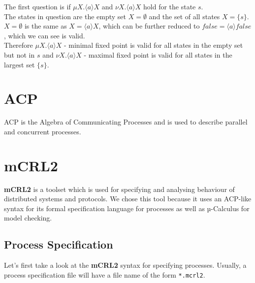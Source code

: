 \documentclass{clseminar}
\begin{document}
  \begin{center}
  \end{center}

  The first question is if $\mu X. \langle a \rangle X$ and $\nu X. \langle a \rangle X$ hold for the state $s$. \\
  The states in question are the empty set $X = \emptyset$ and the set of all states $X = \{s\}$. \\
  $X = \emptyset$ is the same as $X = \langle a \rangle X$, which can be further reduced to $\mathit{false} = \langle a \rangle \mathit{false}$, which we can see is valid. \\
  Therefore $\mu X. \langle a \rangle X$ - minimal fixed point is valid for all states in the empty set but not in $s$ and $\nu X. \langle a \rangle X$ - maximal fixed point is valid for all states in the largest set $\{s\}$.

  \section{ACP}

  ACP is the Algebra of Communicating Processes and is used to describe parallel and concurrent processes.

  \cite{groote2014}

  \section{mCRL2}

  \textbf{mCRL2} is a toolset which is used for specifying and analysing behaviour of distributed systems and protocols. We chose this tool because it uses an ACP-like syntax for its formal specification language for processes as well as µ-Calculus for model checking.

  \subsection{Process Specification}

  Let's first take a look at the \textbf{mCRL2} syntax for specifying processes. Usually, a process specification file will have a file name of the form \texttt{*.mcrl2}.
\end{document}
